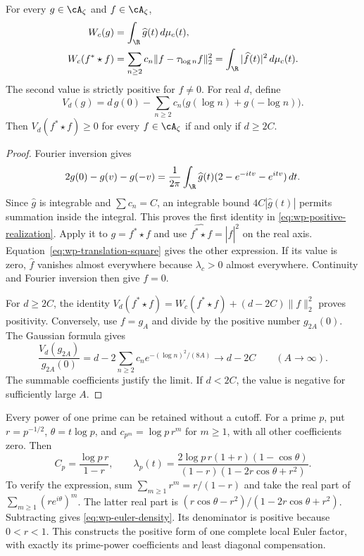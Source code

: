 \begin{theorem}
\label{thm:wp-positive-form}
For every $g\in\cA_\zeta$ and $f\in\cA_\zeta$,
\begin{equation}
 \begin{aligned}
 W_c(g)&=\int_{\R}\widehat g(t)\,d\mu_c(t),\\
 W_c(f^*\star f)
 &=\sum_{n\geq2}c_n\|f-\tau_{\log n}f\|_2^2
   =\int_{\R}|\widehat f(t)|^2\,d\mu_c(t).
 \end{aligned}
 \label{eq:wp-positive-realization}
\end{equation}
The second value is strictly positive for $f\ne0$.
For real $d$, define
\[
 V_d(g)=d\,g(0)-\sum_{n\geq2}c_n
                         \bigl(g(\log n)+g(-\log n)\bigr).
\]
Then $V_d(f^*\star f)\geq0$ for every $f\in\cA_\zeta$
if and only if $d\geq2C$.
\end{theorem}
\begin{proof}
Fourier inversion gives
\[
 2g(0)-g(v)-g(-v)
 =\frac1{2\pi}\int_{\R}\widehat g(t)(2-e^{-itv}-e^{itv})\,dt.
\]
Since $\widehat g$ is integrable and $\sum c_n=C$, an integrable
bound $4C|\widehat g(t)|$ permits summation inside the integral.
This proves the first identity in \eqref{eq:wp-positive-realization}.
Apply it to $g=f^*\star f$ and use
$\widehat{f^*\star f}=|\widehat f|^2$ on the real axis.
Equation~\eqref{eq:wp-translation-square} gives the other expression.
If its value is zero, $\widehat f$ vanishes almost everywhere because
$\lambda_c>0$ almost everywhere.
Continuity and Fourier inversion then give $f=0$.

For $d\geq2C$, the identity
$V_d(f^*\star f)=W_c(f^*\star f)+(d-2C)\|f\|_2^2$
proves positivity.
Conversely, use $f=g_A$ and divide by the positive number $g_{2A}(0)$.
The Gaussian formula gives
\[
 \frac{V_d(g_{2A})}{g_{2A}(0)}
 =d-2\sum_{n\geq2}c_n e^{-(\log n)^2/(8A)}
 \longrightarrow d-2C\qquad(A\to\infty).
\]
The summable coefficients justify the limit.
If $d<2C$, the value is negative for sufficiently large $A$.
\end{proof}

Every power of one prime can be retained without a cutoff.
For a prime $p$, put $r=p^{-1/2}$, $\theta=t\log p$, and
$c_{p^m}=\log p\,r^m$ for $m\geq1$, with all other coefficients zero.
Then
\begin{equation}
 C_p=\frac{\log p\,r}{1-r},\qquad
 \lambda_p(t)=
 \frac{2\log p\,r(1+r)(1-\cos\theta)}
 {(1-r)(1-2r\cos\theta+r^2)}.
 \label{eq:wp-euler-density}
\end{equation}
To verify the expression, sum $\sum_{m\geq1}r^m=r/(1-r)$ and
take the real part of $\sum_{m\geq1}(re^{i\theta})^m$.
The latter real part is
$(r\cos\theta-r^2)/(1-2r\cos\theta+r^2)$.
Subtracting gives \eqref{eq:wp-euler-density}.
Its denominator is positive because $0<r<1$.
This constructs the positive form of one complete local Euler factor,
with exactly its prime-power coefficients and least diagonal compensation.

